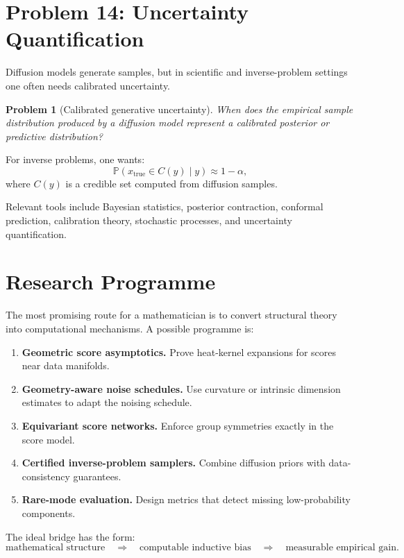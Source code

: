\documentclass[11pt]{article}
\newtheorem{problem}{Problem}
\begin{document}
\section{Problem 14: Uncertainty Quantification}

Diffusion models generate samples, but in scientific and inverse-problem settings one often needs calibrated uncertainty.

\begin{problem}[Calibrated generative uncertainty]
When does the empirical sample distribution produced by a diffusion model represent a calibrated posterior or predictive distribution?
\end{problem}

For inverse problems, one wants:
\begin{equation}
\mathbb{P}(x_{\mathrm{true}} \in C(y)\mid y) \approx 1-\alpha,
\end{equation}
where $C(y)$ is a credible set computed from diffusion samples.

Relevant tools include Bayesian statistics, posterior contraction, conformal prediction, calibration theory, stochastic processes, and uncertainty quantification.

\section{Research Programme}

The most promising route for a mathematician is to convert structural theory into computational mechanisms. A possible programme is:

\begin{enumerate}[leftmargin=*]
\item \textbf{Geometric score asymptotics.} Prove heat-kernel expansions for scores near data manifolds.
\item \textbf{Geometry-aware noise schedules.} Use curvature or intrinsic dimension estimates to adapt the noising schedule.
\item \textbf{Equivariant score networks.} Enforce group symmetries exactly in the score model.
\item \textbf{Certified inverse-problem samplers.} Combine diffusion priors with data-consistency guarantees.
\item \textbf{Rare-mode evaluation.} Design metrics that detect missing low-probability components.
\end{enumerate}

The ideal bridge has the form:
\begin{equation}
\text{mathematical structure}
\quad \Longrightarrow \quad
\text{computable inductive bias}
\quad \Longrightarrow \quad
\text{measurable empirical gain}.
\end{equation}
\end{document}
